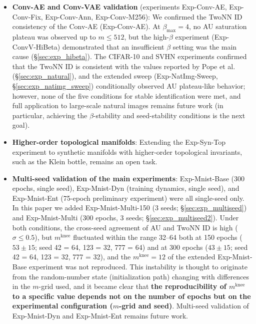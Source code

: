\documentclass[make,article,submit,pdftex,moreauthors]{Definitions/mdpi}
\newcommand{\mknee}{m^{\mathrm{knee}}}
\begin{document}
\begin{itemize}
  \item \textbf{Conv-AE and Conv-VAE validation} (experiments Exp-Conv-AE, Exp-Conv-Fix,
        Exp-Conv-Ann, Exp-Conv-M256):
        We confirmed the TwoNN ID consistency of the Conv-AE (Exp-Conv-AE).
        At $\beta_{\max}=4$, no AU saturation plateau was observed up to $m \leq 512$,
        but the high-$\beta$ experiment (Exp-ConvV-HiBeta) demonstrated that an
        insufficient $\beta$ setting was the main cause (\S\ref{sec:exp_hibeta}).
        The CIFAR-10 and SVHN experiments confirmed that the TwoNN ID is consistent with
        the values reported by Pope et al.~\cite{pope2021intrinsic}
        (\S\ref{sec:exp_natural}), and the extended sweep (Exp-NatImg-Sweep,
        \S\ref{sec:exp_natimg_sweep}) conditionally observed AU plateau-like behavior;
        however, none of the five conditions for stable identification were met, and
        full application to large-scale natural images remains future work (in
        particular, achieving the $\beta$-stability and seed-stability conditions is
        the next goal).
  \item \textbf{Higher-order topological manifolds}: Extending the Exp-Syn-Top
        experiment to synthetic manifolds with higher-order topological invariants,
        such as the Klein bottle, remains an open task.
  \item \textbf{Multi-seed validation of the main experiments}:
        Exp-Mnist-Base (300 epochs, single seed), Exp-Mnist-Dyn (training dynamics,
        single seed), and Exp-Mnist-Ent (75-epoch preliminary experiment) were all
        single-seed only.
        In this paper we added Exp-Mnist-Multi-150 (3 seeds; \S\ref{sec:exp_multiseed})
        and Exp-Mnist-Multi (300 epochs, 3 seeds; \S\ref{sec:exp_multiseed2}).
        Under both conditions, the cross-seed agreement of AU and TwoNN ID is high
        ($\sigma \leq 0.5$), but $\mknee$ fluctuated within the range 32--64 both at
        150 epochs ($53 \pm 15$; seed 42 = 64, 123 = 32, 777 = 64) and at 300 epochs
        ($43 \pm 15$; seed 42 = 64, 123 = 32, 777 = 32), and the $\mknee = 12$ of the
        extended Exp-Mnist-Base experiment was not reproduced.
        This instability is thought to originate from the random-number state
        (initialization path) changing with differences in the $m$-grid used, and it
        became clear that \textbf{the reproducibility of $\mknee$ to a specific value
        depends not on the number of epochs but on the experimental configuration
        ($m$-grid and seed)}.
        Multi-seed validation of Exp-Mnist-Dyn and Exp-Mnist-Ent remains future work.
\end{itemize}
\end{document}
